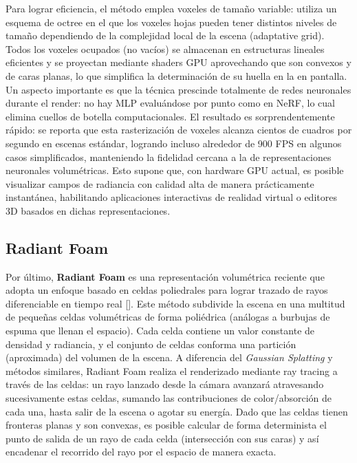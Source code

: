 Para lograr eficiencia, el método emplea voxeles de tamaño variable: utiliza un esquema de octree en el que los voxeles hojas pueden tener distintos niveles de tamaño dependiendo de la complejidad local de la escena (adaptative grid). Todos los voxeles ocupados (no vacíos) se almacenan en estructuras lineales eficientes y se proyectan mediante shaders GPU aprovechando que son convexos y de caras planas, lo que simplifica la determinación de su huella en la en pantalla. Un aspecto importante es que la técnica prescinde totalmente de redes neuronales durante el render: no hay MLP evaluándose por punto como en NeRF, lo cual elimina cuellos de botella computacionales. El resultado es sorprendentemente rápido: se reporta que esta rasterización de voxeles alcanza cientos de cuadros por segundo en escenas estándar, logrando incluso alrededor de 900 FPS en algunos casos simplificados, manteniendo la fidelidad cercana a la de representaciones neuronales volumétricas. Esto supone que, con hardware GPU actual, es posible visualizar campos de radiancia con calidad alta de manera prácticamente instantánea, habilitando aplicaciones interactivas de realidad virtual o editores 3D basados en dichas representaciones.

\subsection{Radiant Foam}

Por último, \textbf{Radiant Foam} es una representación volumétrica reciente que adopta un enfoque basado en celdas poliedrales para lograr trazado de rayos diferenciable en tiempo real [\cite{govindarajan2025radiant}]. Este método subdivide la escena en una multitud de pequeñas celdas volumétricas de forma poliédrica (análogas a burbujas de espuma que llenan el espacio). Cada celda contiene un valor constante de densidad y radiancia, y el conjunto de celdas conforma una partición (aproximada) del volumen de la escena. A diferencia del \textit{Gaussian Splatting} y métodos similares, Radiant Foam realiza el renderizado mediante ray tracing a través de las celdas: un rayo lanzado desde la cámara avanzará atravesando sucesivamente estas celdas, sumando las contribuciones de color/absorción de cada una, hasta salir de la escena o agotar su energía. Dado que las celdas tienen fronteras planas y son convexas, es posible calcular de forma determinista el punto de salida de un rayo de cada celda (intersección con sus caras) y así encadenar el recorrido del rayo por el espacio de manera exacta.

